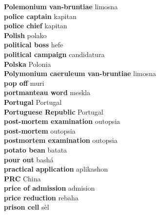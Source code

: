 \textbf{ Polemonium van-bruntiae  } limosna \\
\textbf{ police captain  } kapitan \\
\textbf{ police chief  } kapitan \\
\textbf{ Polish  } polako \\
\textbf{ political boss  } hefe \\
\textbf{ political campaign  } candidatura \\
\textbf{ Polska  } Polonia \\
\textbf{ Polymonium caeruleum van-bruntiae  } limosna \\
\textbf{ pop off  } muri \\
\textbf{ portmanteau word  } meskla \\
\textbf{ Portugal  } Portugal \\
\textbf{ Portuguese Republic  } Portugal \\
\textbf{ post-mortem examination  } outopsia \\
\textbf{ post-mortem  } outopsia \\
\textbf{ postmortem examination  } outopsia \\
\textbf{ potato bean  } batata \\
\textbf{ pour out  } bashá \\
\textbf{ practical application  } aplikashon \\
\textbf{ PRC  } China \\
\textbf{ price of admission  } admision \\
\textbf{ price reduction  } rebaha \\
\textbf{ prison cell  } sèl \\
